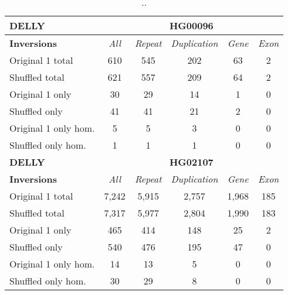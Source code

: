 \begin{table}[htb]
\caption{ .. }
\begin{center}
\begin{tabular}{|l|c||c|c|c|c|}
\hline
{\bf DELLY} & \multicolumn{5}{|c|}{\bf HG00096} \\
\hline
\cline{2-6}
{\bf Inversions} & {\it All} & {\it Repeat} & {\it Duplication} & {\it Gene} & {\it Exon} \\
\hline
Original 1 total & 610 & 545 & 202 & 63 & 2\\ 
\hline
Shuffled total & 621 & 557 & 209 & 64 & 2\\ 
\hline
Original 1 only & 30 & 29 & 14 & 1 & 0\\ 
\hline
Shuffled only & 41 & 41 & 21 & 2 & 0\\ 
\hline
Original 1 only hom. & 5 & 5 & 3 & 0 & 0\\ 
\hline
Shuffled only hom. & 1 & 1 & 1 & 0 & 0\\ 
\hline
\hline
{\bf DELLY} & \multicolumn{5}{|c|}{\bf HG02107} \\
\hline
\cline{2-6}
{\bf Inversions} & {\it All} & {\it Repeat} & {\it Duplication} & {\it Gene} & {\it Exon} \\
\hline
Original 1 total & 7,242 & 5,915 & 2,757 & 1,968 & 185\\ 
\hline
Shuffled total & 7,317 & 5,977 & 2,804 & 1,990 & 183\\ 
\hline
Original 1 only & 465 & 414 & 148 & 25 & 2\\ 
\hline
Shuffled only & 540 & 476 & 195 & 47 & 0\\ 
\hline
Original 1 only hom. & 14 & 13 & 5 & 0 & 0\\ 
\hline
Shuffled only hom. & 30 & 29 & 8 & 0 & 0\\ 
\hline
\end{tabular}
\end{center}
\label{tab:orig-vs-shuf-delly-inv}
\end{table}

